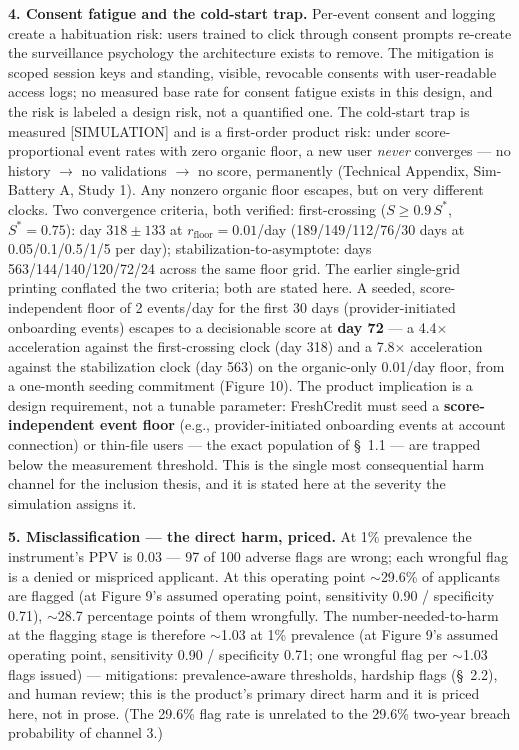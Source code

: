 \documentclass[
]{article}
\begin{document}
\textbf{4. Consent fatigue and the cold-start trap.} Per-event consent
and logging create a habituation risk: users trained to click through
consent prompts re-create the surveillance psychology the architecture
exists to remove. The mitigation is scoped session keys and standing,
visible, revocable consents with user-readable access logs; no measured
base rate for consent fatigue exists in this design, and the risk is
labeled a design risk, not a quantified one. The cold-start trap is
measured {[}SIMULATION{]} and is a first-order product risk: under
score-proportional event rates with zero organic floor, a new user
\emph{never} converges --- no history \(\rightarrow\) no validations
\(\rightarrow\) no score, permanently (Technical Appendix, Sim-Battery
A, Study 1). Any nonzero organic floor escapes, but on very different
clocks. Two convergence criteria, both verified: first-crossing
(\(S \geq 0.9\,S^*\), \(S^* = 0.75\)): day \(318 \pm 133\) at
\(r_{\mathrm{floor}} = 0.01\)/day (189/149/112/76/30 days at
0.05/0.1/0.5/1/5 per day); stabilization-to-asymptote: days
563/144/140/120/72/24 across the same floor grid. The earlier
single-grid printing conflated the two criteria; both are stated here. A
seeded, score-independent floor of 2 events/day for the first 30 days
(provider-initiated onboarding events) escapes to a decisionable score
at \textbf{day 72} --- a 4.4\(\times\) acceleration against the
first-crossing clock (day 318) and a 7.8\(\times\) acceleration against
the stabilization clock (day 563) on the organic-only 0.01/day floor,
from a one-month seeding commitment (Figure 10). The product implication
is a design requirement, not a tunable parameter: FreshCredit must seed
a \textbf{score-independent event floor} (e.g., provider-initiated
onboarding events at account connection) or thin-file users --- the
exact population of §~1.1 --- are trapped below the measurement
threshold. This is the single most consequential harm channel for the
inclusion thesis, and it is stated here at the severity the simulation
assigns it.

\textbf{5. Misclassification --- the direct harm, priced.} At 1\%
prevalence the instrument's PPV is 0.03 --- 97 of 100 adverse flags are
wrong; each wrongful flag is a denied or mispriced applicant. At this
operating point \(\sim\)29.6\% of applicants are flagged (at Figure 9's
assumed operating point, sensitivity 0.90 / specificity 0.71),
\(\sim\)28.7 percentage points of them wrongfully. The
number-needed-to-harm at the flagging stage is therefore \(\sim\)1.03 at
1\% prevalence (at Figure 9's assumed operating point, sensitivity 0.90
/ specificity 0.71; one wrongful flag per \(\sim\)1.03 flags issued) ---
mitigations: prevalence-aware thresholds, hardship flags (§~2.2), and
human review; this is the product's primary direct harm and it is priced
here, not in prose. (The 29.6\% flag rate is unrelated to the 29.6\%
two-year breach probability of channel 3.)
\end{document}
